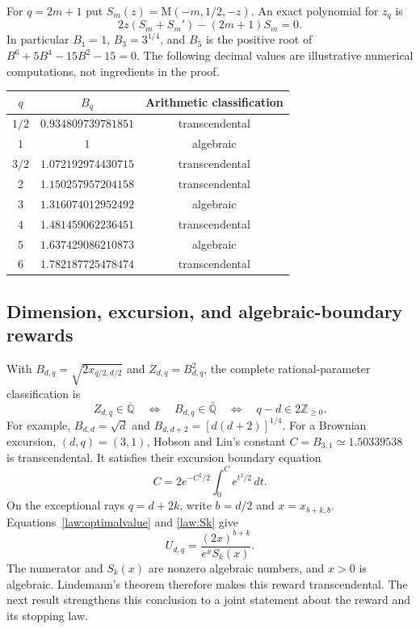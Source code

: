 \documentclass[11pt,a4paper]{article}
\newcommand{\Qbar}{\overline{\mathbb Q}}
\newcommand{\M}{\mathrm M}
\theoremstyle{definition}
\theoremstyle{remark}
\numberwithin{equation}{section}
\begin{document}
For $q=2m+1$ put $S_m(z)=\M(-m,1/2,-z)$. An exact polynomial for
$z_q$ is
\[
 2z(S_m+S_m')-(2m+1)S_m=0.
\]
In particular $B_1=1$, $B_3=3^{1/4}$, and $B_5$ is the positive
root of $B^6+5B^4-15B^2-15=0$.
The following decimal values are illustrative numerical computations,
not ingredients in the proof.
\begin{center}
\begin{tabular}{ccc}\toprule
$q$&$B_q$&Arithmetic classification\\\midrule
$1/2$&$0.934809739781851$&transcendental\\
$1$&$1$&algebraic\\
$3/2$&$1.072192974430715$&transcendental\\
$2$&$1.150257957204158$&transcendental\\
$3$&$1.316074012952492$&algebraic\\
$4$&$1.481459062236451$&transcendental\\
$5$&$1.637429086210873$&algebraic\\
$6$&$1.782187725478474$&transcendental\\\bottomrule
\end{tabular}
\end{center}


\subsection{Dimension, excursion, and algebraic-boundary rewards}
With $B_{d,q}=\sqrt{2x_{q/2,d/2}}$ and $Z_{d,q}=B_{d,q}^2$, the
complete rational-parameter classification is
\begin{equation}\label{opt:besselclassification}
 Z_{d,q}\in\Qbar
 \quad\Longleftrightarrow\quad B_{d,q}\in\Qbar
 \quad\Longleftrightarrow\quad q-d\in2\mathbb Z_{\geq0}.
\end{equation}
For example, $B_{d,d}=\sqrt d$ and
$B_{d,d+2}=[d(d+2)]^{1/4}$. For a Brownian excursion, $(d,q)=(3,1)$,
Hobson and Liu's constant
$C=B_{3,1}\simeq1.50339538$ is transcendental. It satisfies their
excursion boundary equation
\[
 C=2e^{-C^2/2}\int_0^C e^{t^2/2}\,dt.
\]
On the exceptional rays $q=d+2k$, write $b=d/2$ and
$x=x_{b+k,b}$. Equations~\eqref{law:optimalvalue} and \eqref{law:Sk} give
\[
 U_{d,q}=\frac{(2x)^{b+k}}{e^xS_k(x)}.
\]
The numerator and $S_k(x)$ are nonzero algebraic numbers, and $x>0$
is algebraic. Lindemann's theorem therefore makes this reward
transcendental. The next result strengthens this conclusion to a
joint statement about the reward and its stopping law.
\end{document}
